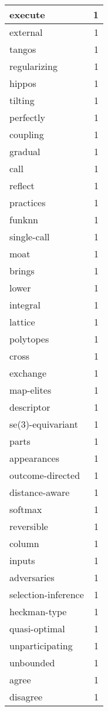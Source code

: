 \begin{table}[h]
\begin{tabular}{|l|r|}
\hline
execute & 1 \\
\hline
external & 1 \\
\hline
tangos & 1 \\
\hline
regularizing & 1 \\
\hline
hippos & 1 \\
\hline
tilting & 1 \\
\hline
perfectly & 1 \\
\hline
coupling & 1 \\
\hline
gradual & 1 \\
\hline
call & 1 \\
\hline
reflect & 1 \\
\hline
practices & 1 \\
\hline
funknn & 1 \\
\hline
single-call & 1 \\
\hline
moat & 1 \\
\hline
brings & 1 \\
\hline
lower & 1 \\
\hline
integral & 1 \\
\hline
lattice & 1 \\
\hline
polytopes & 1 \\
\hline
cross & 1 \\
\hline
exchange & 1 \\
\hline
map-elites & 1 \\
\hline
descriptor & 1 \\
\hline
se(3)-equivariant & 1 \\
\hline
parts & 1 \\
\hline
appearances & 1 \\
\hline
outcome-directed & 1 \\
\hline
distance-aware & 1 \\
\hline
softmax & 1 \\
\hline
reversible & 1 \\
\hline
column & 1 \\
\hline
inputs & 1 \\
\hline
adversaries & 1 \\
\hline
selection-inference & 1 \\
\hline
heckman-type & 1 \\
\hline
quasi-optimal & 1 \\
\hline
unparticipating & 1 \\
\hline
unbounded & 1 \\
\hline
agree & 1 \\
\hline
disagree & 1 \\

\end{tabular}
\end{table}
